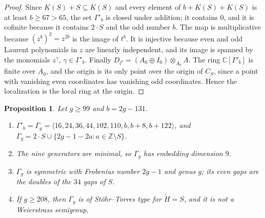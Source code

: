 \documentclass{amsart}
\newtheorem{proposition}[theorem]{Proposition}
\theoremstyle{definition}
\theoremstyle{remark}
\numberwithin{equation}{section}
\newcommand{\C}{\mathbb{C}}
\newcommand{\Z}{\mathbb{Z}}
\begin{document}
\begin{proof}
Since $K(S)+S\subseteq K(S)$ and every element of $b+K(S)+K(S)$ is at least $b\ge67>65$, the set $\Gamma'_b$ is closed under addition; it contains $0$, and it is cofinite because it contains $2\cdot S$ and the odd number $b$. The map is multiplicative because $(z^b)^2=z^{2b}$ is the image of $t^b$. It is injective because even and odd Laurent polynomials in $z$ are linearly independent, and its image is spanned by the monomials $z^\gamma$, $\gamma\in\Gamma'_b$. Finally $D_{t^b}=(A_0\oplus I_0)\otimes_{A_0}A$. The ring $\C[\Gamma'_b]$ is finite over $A_0$, and the origin is its only point over the origin of $C_S$, since a point with vanishing even coordinates has vanishing odd coordinates. Hence the localization is the local ring at the origin.
\end{proof}

\begin{proposition}\label{prop:semigroup}
Let $g\ge99$ and $b=2g-131$.
\begin{enumerate}
\item $\Gamma'_b=\Gamma_g=\langle16,24,36,44,102,110,b,b+8,b+122\rangle$, and $\Gamma_g=2\cdot S\cup\{2g-1-2a:a\in\Z\setminus S\}$.
\item The nine generators are minimal, so $\Gamma_g$ has embedding dimension $9$.
\item $\Gamma_g$ is symmetric with Frobenius number $2g-1$ and genus $g$; its even gaps are the doubles of the $34$ gaps of $S$.
\item If $g\ge208$, then $\Gamma_g$ is of St\"ohr--Torres type for $\tilde H=S$, and it is not a Weierstrass semigroup.
\end{enumerate}
\end{proposition}
\end{document}
